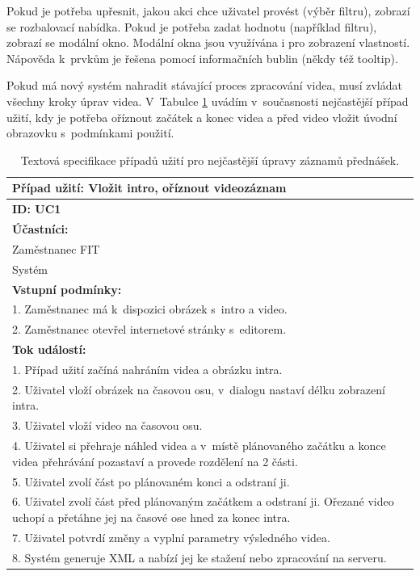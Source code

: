 Pokud je potřeba upřesnit, jakou akci chce uživatel provést (výběr filtru), zobrazí se rozbalovací nabídka. Pokud je potřeba zadat hodnotu (například filtru), zobrazí se modální okno. Modální okna jsou využívána i pro zobrazení vlastností. Nápověda k~prvkům je řešena pomocí informačních bublin (někdy též tooltip).

Pokud má nový systém nahradit stávající proces zpracování videa, musí zvládat všechny kroky úprav videa. V~Tabulce \ref{tab:uc1} uvádím v~současnosti nejčastější případ užití, kdy je potřeba oříznout začátek a konec videa a před video vložit úvodní obrazovku s~podmínkami použití.

\begin{table}[h]
    \centering
    \begin{tabular}{|p{14cm}|}
        \hline
        Případ užití: Vložit intro, oříznout videozáznam\\ \hline
        \textbf{ID: UC1}\\ \hline
        \textbf{Účastníci:}\\
        Zaměstnanec FIT\\
        Systém\\ \hline
        \textbf{Vstupní podmínky:}\\
        1. Zaměstnanec má k~dispozici obrázek s~intro a video.\\
        2. Zaměstnanec otevřel internetové stránky s~editorem.\\ \hline
        \textbf{Tok událostí:}\\
        1. Případ užití začíná nahráním videa a obrázku intra.\\
        2. Uživatel vloží obrázek na časovou osu, v~dialogu nastaví délku zobrazení intra.\\
        3. Uživatel vloží video na časovou osu.\\
        4. Uživatel si přehraje náhled videa a v~místě plánovaného začátku a konce videa přehrávání pozastaví a provede rozdělení na 2 části.\\
        5. Uživatel zvolí část po plánovaném konci a odstraní ji.\\
        6. Uživatel zvolí část před plánovaným začátkem a odstraní ji. Ořezané video uchopí a přetáhne jej na časové ose hned za konec intra.\\
        7. Uživatel potvrdí změny a vyplní parametry výsledného videa.\\
        8. Systém generuje XML a nabízí jej ke stažení nebo zpracování na serveru.\\
        \hline
    \end{tabular}
    \caption{Textová specifikace případů užití pro nejčastější úpravy záznamů přednášek.}
    \label{tab:uc1}
\end{table}

